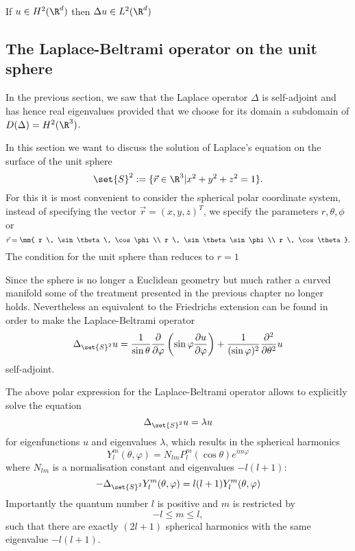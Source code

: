 If $u \in H^2(\R^d)$ then $\Delta u \in L^2(\R^d)$

\subsection{The Laplace-Beltrami operator on the unit sphere}
\label{sec:SpectrumLaplaceBeltrami}

In the previous section, we saw that the Laplace operator $\Delta$
is self-adjoint and has hence real eigenvalues provided that
we choose for its domain a subdomain of $D(\Delta) = H^2(\R^3)$.

In this section we want to discuss the solution of Laplace's equation
on the surface of the unit sphere
\[
	\set{S}^2 := \{ \vec{r} \in \R^3 | x^2 + y^2 + z^2 = 1 \}.
\]
For this it is most convenient to consider
the spherical polar coordinate system,
\ie instead of specifying the vector $\vec{r} = (x, y, z)^T$,
we specify the parameters $r, \theta, \phi$ or
\[ \vec{r} = \mm{ r \, \sin \theta \, \cos \phi \\ r \, \sin \theta \sin \phi \\
r \, \cos \theta }. \]
The condition for the unit sphere than reduces to $r=1$

Since the sphere is no longer a Euclidean geometry
but much rather a curved manifold some of the treatment presented
in the previous chapter no longer holds.
Nevertheless an equivalent to the Friedrichs extension can be found
in order to make the Laplace-Beltrami operator
\[ \Delta_{\set{S}^2} u = \frac{1}{\sin \theta} \frac{\partial}{\partial \varphi}
\left( \sin \varphi \frac{\partial u}{\partial \varphi}  \right)
+ \frac{1}{(\sin \varphi)^2} \frac{\partial^2}{\partial \theta^2} u\]
self-adjoint.

The above polar expression for the Laplace-Beltrami operator
allows to explicitly solve the equation
\newcommand{\laplaceSphere}{\Delta_{\set{S}^2}}
\[ \laplaceSphere u = \lambda u \]
for eigenfunctions $u$ and eigenvalues $\lambda$,
which results in the spherical harmonics
\[ Y_l^m(\theta, \varphi) = N_{lm} P_l^m(\cos \theta) e^{im\varphi} \]
where $N_{lm}$ is a normalisation constant
and eigenvalues $-l (l+1)$:
\begin{equation}
	-\laplaceSphere Y_l^m(\theta, \varphi) = l (l+1) Y_l^m(\theta, \varphi)
	\label{eqn:Laplace}
\end{equation}
Importantly the quantum number $l$ is positive and $m$ is restricted by
\[ -l \le m \le l, \]
such that there are exactly $(2l+1)$ spherical harmonics with the same eigenvalue
$-l (l+1)$.

